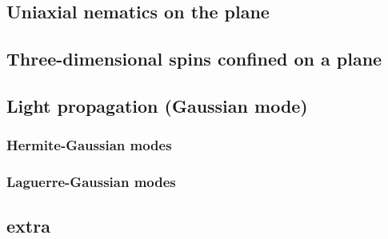 \documentclass{book}
\begin{document}
\subsection{Uniaxial nematics on the plane}
\subsection{Three-dimensional spins confined on a plane}
\subsection{Light propagation (Gaussian mode)}
\subsubsection{Hermite-Gaussian modes}
\subsubsection{Laguerre-Gaussian modes}
\subsection{extra}

% 
\end{document}
